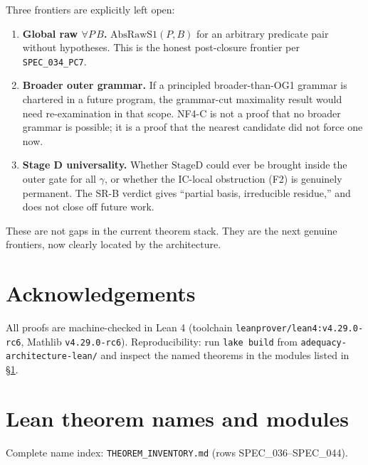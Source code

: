\documentclass[11pt]{article}
\theoremstyle{plain}
\theoremstyle{definition}
\newcommand{\AbsRawSone}{\mathrm{AbsRawS1}}
\newcommand{\StageD}{\mathrm{StageD}}
\newcommand{\lean}[1]{\texttt{\small #1}}
\begin{document}
Three frontiers are explicitly left open:

\begin{enumerate}[label=(\Roman*)]
  \item \textbf{Global raw $\forall P\,B$.}
    $\AbsRawSone(P,B)$ for an arbitrary predicate pair without hypotheses.
    This is the honest post-closure frontier per \lean{SPEC\_034\_PC7}.

  \item \textbf{Broader outer grammar.}
    If a principled broader-than-OG1 grammar is chartered in a future program,
    the grammar-cut maximality result would need re-examination in that scope.
    NF4-C is not a proof that no broader grammar is possible; it is a proof
    that the nearest candidate did not force one now.

  \item \textbf{Stage D universality.}
    Whether $\StageD$ could ever be brought inside the outer gate for all
    $\gamma$, or whether the IC-local obstruction (F2) is genuinely permanent.
    The SR-B verdict gives ``partial basis, irreducible residue,'' and does
    not close off future work.
\end{enumerate}

These are not gaps in the current theorem stack.  They are the next genuine
frontiers, now clearly located by the architecture.

\section*{Acknowledgements}

All proofs are machine-checked in Lean 4 (toolchain
\lean{leanprover/lean4:v4.29.0-rc6}, Mathlib \lean{v4.29.0-rc6}).
Reproducibility: run \lean{lake build} from
\lean{adequacy-architecture-lean/} and inspect the named theorems in the
modules listed in \S\ref{sec:appendix}.

\appendix
\section{Lean theorem names and modules}
\label{sec:appendix}

Complete name index: \lean{THEOREM\_INVENTORY.md} (rows SPEC\_036--SPEC\_044).
\end{document}

